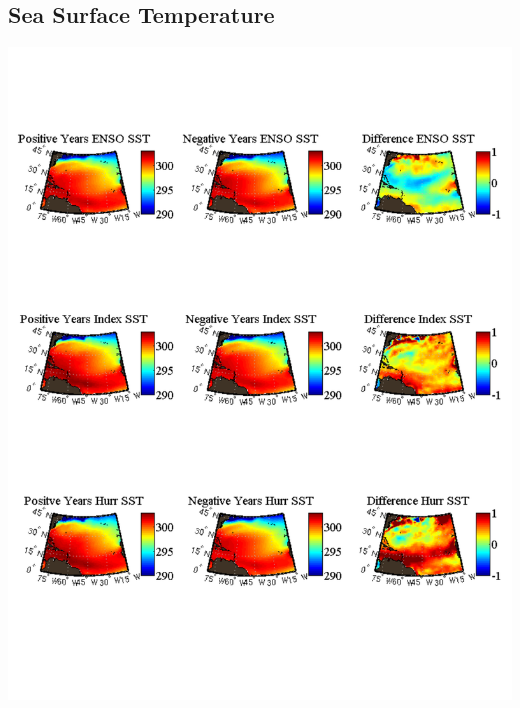 \documentclass[11pt]{article}
\begin{document}
\subsection{Sea Surface Temperature}
\includegraphics[scale=.75]{images/compareSSTComposites.pdf}
\newpage
\end{document}
